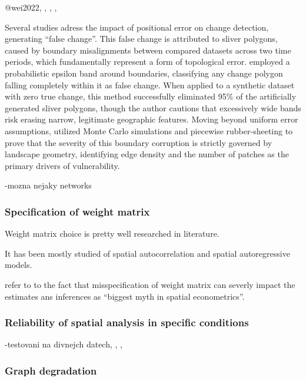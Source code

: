 \documentclass[
  english,
  12pt,
  a4paper,
]{article}
\begin{document}
@wei2022, \citet{murray2012}, \citet{heuvelink1998},
\citet{uncertai2015}, \citet{griffith2018}

Several studies adress the impact of positional error on change
detection, generating ``false change''. This false change is attributed
to sliver polygons, caused by boundary misalignments between compared
datasets across two time periods, which fundamentally represent a form
of topological error. \citet{mas2005} employed a probabilistic epsilon
band \citep[\citet{chrisman}]{perkal1956epsilon} around boundaries,
classifying any change polygon falling completely within it as false
change. When applied to a synthetic dataset with zero true change, this
method successfully eliminated 95\% of the artificially generated sliver
polygons, though the author cautions that excessively wide bands risk
erasing narrow, legitimate geographic features. Moving beyond uniform
error assumptions, \citet{declercq2009} utilized Monte Carlo simulations
and piecewise rubber-sheeting to prove that the severity of this
boundary corruption is strictly governed by landscape geometry,
identifying edge density and the number of patches as the primary
drivers of vulnerability.

-mozna nejaky networks

\subsubsection{Specification of weight
matrix}\label{specification-of-weight-matrix}

Weight matrix choice is pretty well researched in literature.
\citet{wei2012}

It has been mostly studied of spatial autocorrelation and spatial
autoregressive models.

\citet{lesage2010} refer to to the fact that misspecification of weight
matrix can severly impact the estimates ans inferences as ``biggest myth
in spatial econometrics''.

\subsubsection{Reliability of spatial analysis in specific
conditions}\label{reliability-of-spatial-analysis-in-specific-conditions}

-testovani na divnejch datech, \citet{westerholt_social_media},
\citet{westerholt_poisson}, \citet{westerholt_interference}

\subsubsection{Graph degradation}\label{graph-degradation}
\end{document}
